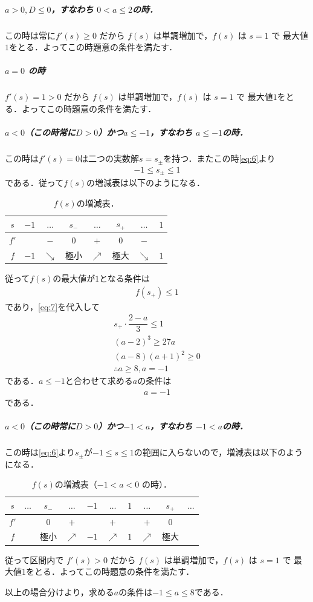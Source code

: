 \documentclass[../../main.tex]{subfiles}
\begin{document}
\subparagraph{$a>0, D \le 0$，すなわち $0 < a \le 2$の時．}

この時は常に$f'(s)\ge 0$ だから $f(s)$ は単調増加で，$f(s)$ は $s=1$ で 最大値$1$をとる．よってこの時題意の条件を満たす．

\subparagraph{$a=0$ の時}

$f'(s)=1>0$ だから $f(s)$ は単調増加で，$f(s)$ は $s=1$ で 最大値$1$をとる．よってこの時題意の条件を満たす．

\subparagraph{$a<0$（この時常に$D>0$）かつ$a \le -1$，すなわち $a \le -1$の時．}

この時は$f'(s)=0$は二つの実数解$s=s_{\pm}$を持つ．またこの時\cref{eq:6}より
\begin{align}
  -1 \le s_{\pm} \le 1
\end{align}
である．従って$f(s)$の増減表は以下のようになる．

\begin{table}[htb]
  \centering
  \caption{$f(s)$の増減表．}
  \begin{tabular}{c|ccccccc}
    $s$  & $-1$ & $\dots$ & $s_{-}$ & $\dots$ & $s_{+}$ & $\dots$ & $1$ \\ \hline
    $f'$ & & $-$ & $0$ & $+$ & $0$  & $-$ & \\ \hline
    $f$  & $-1$ & $\searrow$ & 極小 & $\nearrow$ & 極大 & $\searrow$ & $1$
  \end{tabular}
\end{table}

従って$f(s)$の最大値が$1$となる条件は
\begin{align}
  f(s_{+}) \le 1
\end{align}
であり，\cref{eq:7}を代入して
\begin{align}
  s_{+}\cdot\dfrac{2-a}{3} \le 1 \\
  (a-2)^3 \ge 27a \\
  (a-8)(a+1)^2 \ge 0 \\
  \therefore a \ge 8, a = -1
\end{align}
である．$a \le -1$と合わせて求める$a$の条件は
\begin{align}
  a = -1
\end{align}
である．

\subparagraph{$a<0$（この時常に$D>0$）かつ$-1 < a$，すなわち $-1 < a$の時．}

この時は\cref{eq:6}より$s_{\pm}$が$-1\le s \le 1$の範囲に入らないので，増減表は以下のようになる．

\begin{table}[htb]
  \centering
  \caption{$f(s)$の増減表（$-1 < a < 0$ の時）．}
  \begin{tabular}{c|ccccccccc}
    $s$  & $\dots$ & $s_{-}$ & $\dots$ & $-1$ & $\dots$ & $1$ & $\dots$ & $s_{+}$ & $\dots$ \\ \hline
    $f'$ & & $0$ & $+$ & & $+$ & & $+$ & $0$ & \\ \hline
    $f$  & & 極小 & $\nearrow$ & $-1$ & $\nearrow$ & $1$ & $\nearrow$ & 極大 &
  \end{tabular}
\end{table}

従って区間内で $f'(s)>0$ だから $f(s)$ は単調増加で，$f(s)$ は $s=1$ で 最大値$1$をとる．よってこの時題意の条件を満たす．
\casesend

以上の場合分けより，求める$a$の条件は$-1\le a\le 8$である．

\newpage
\end{document}
